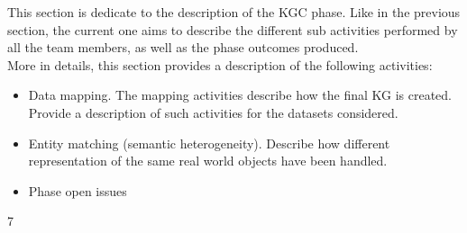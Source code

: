This section is dedicate to the description of the KGC phase. Like in the previous section, the current one aims to describe the different sub activities performed by all the team members, as well as the phase outcomes produced.\\

\noindent More in details, this section provides a description of the following activities:
\begin{itemize}
    \item Data mapping. The mapping activities describe how the final KG is created. Provide a description of such activities for the datasets considered.  
    \item Entity matching (semantic heterogeneity). Describe how different representation of the same real world objects have been handled.
    \item Phase open issues
\end{itemize}


7